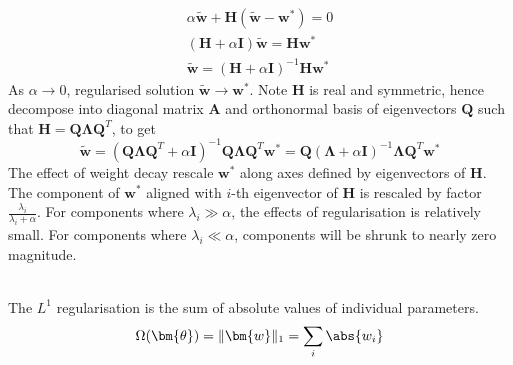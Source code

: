 \begin{remark}
\begin{align}
\alpha \tilde{\bm{w}} + \bm{H}(\tilde{\bm{w}} - \bm{w}^*) = 0 \nonumber \\
(\bm{H} + \alpha \bm{I})\tilde{\bm{w}} = \bm{H} \bm{w}^* \nonumber \\
\tilde{\bm{w}} = (\bm{H} + \alpha \bm{I})^{-1} \bm{H} \bm{w}^* \nonumber
\end{align}
As $\alpha \rightarrow 0$, regularised solution $\tilde{\bm{w}} \rightarrow \bm{w}^*$. Note $\bm{H}$ is real and symmetric, hence decompose into diagonal matrix $\bm{A}$ and orthonormal basis of eigenvectors $\bm{Q}$ such that $\bm{H} = \bm{Q} \bm{\Lambda} \bm{Q}^T$, to get
\begin{equation*}
\tilde{\bm{w}} = (\bm{Q} \bm{\Lambda} \bm{Q}^T + \alpha \bm{I})^{-1} \bm{Q} \bm{\Lambda} \bm{Q}^T \bm{w}^* = \bm{Q} (\bm{\Lambda} + \alpha \bm{I})^{-1} \bm{\Lambda} \bm{Q}^T \bm{w}^* \nonumber
\end{equation*}
The effect of weight decay rescale $\bm{w}^*$ along axes defined by eigenvectors of $\bm{H}$. The component of $\bm{w}^*$ aligned with $i$-th eigenvector of $\bm{H}$ is rescaled by factor $\frac{\lambda_i}{\lambda_i + \alpha}$. For components where $\lambda_i \gg \alpha$, the effects of regularisation is relatively small. For components where $\lambda_i \ll \alpha$, components will be shrunk to nearly zero magnitude.
\end{remark}

\begin{definition} \\
The $L^1$ regularisation is the sum of absolute values of individual parameters.
\begin{equation*}
\Omega(\bm{\theta}) = \Vert \bm{w} \Vert_1 = \sum_i \abs{w_i} \nonumber
\end{equation*}
\end{definition}

